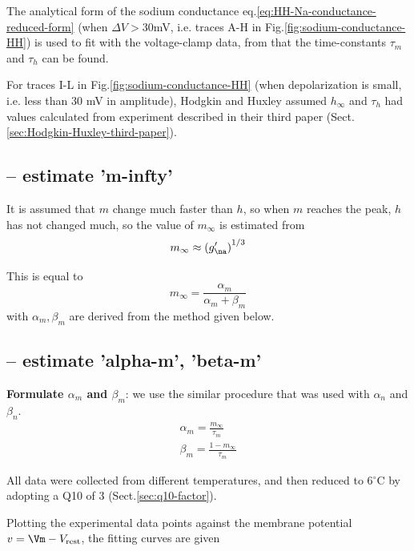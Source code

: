 The analytical form of the sodium conductance eq.\ref{eq:HH-Na-conductance-reduced-form}
(when $\Delta V > 30$mV, i.e. traces A-H in Fig.\ref{fig:sodium-conductance-HH})
is used to fit with the voltage-clamp data, from that the time-constants
$\tau_m$ and $\tau_h$ can be found.

For traces I-L in Fig.\ref{fig:sodium-conductance-HH} (when depolarization is
small, i.e. less than 30 mV in amplitude), Hodgkin and Huxley assumed $h_\infty$
and $\tau_h$ had values calculated from experiment described in their third
paper (Sect.\ref{sec:Hodgkin-Huxley-third-paper}).

\subsection{-- estimate 'm-infty'}

It is assumed that $m$ change much faster than $h$, so when $m$ reaches the
peak, $h$ has not changed much, so the value of $m_\infty$ is estimated from
\begin{equation}
m_\infty \approx \left( g'_{\na} \right)^{1/3}
\end{equation}


This is equal to
\begin{equation}
m_\infty = \frac{\alpha_m}{\alpha_m + \beta_m}
\end{equation}
with $\alpha_m, \beta_m$ are derived from the method given below.


\subsection{-- estimate 'alpha-m', 'beta-m'}


{\bf Formulate $\alpha_m$ and $\beta_m$}: we use the similar procedure
that was used with $\alpha_n$ and $\beta_n$. 
\begin{equation}
\begin{split}
\alpha_m = \frac{m_\infty}{\tau_m} \\
\beta_m = \frac{1- m_\infty}{\tau_m}
\end{split}
\end{equation}

All data were collected from different temperatures, and then reduced to
6$^\circ$C by adopting a Q10 of 3 (Sect.\ref{sec:q10-factor}). 

Plotting the experimental
data points against the membrane potential $v=\Vm - V_\rest$, the fitting curves
are given


